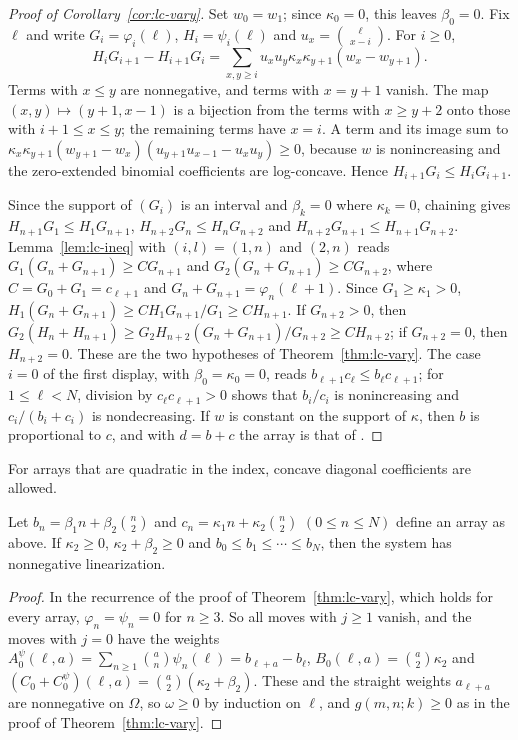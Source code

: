 \begin{proof}[Proof of Corollary~\ref{cor:lc-vary}]
Set $w_0=w_1$; since $\kappa_0=0$, this leaves $\beta_0=0$. Fix $\ell$ and write $G_i=\varphi_i(\ell)$, $H_i=\psi_i(\ell)$ and $u_x=\binom\ell{x-i}$. For $i\geq0$,
\[
H_iG_{i+1}-H_{i+1}G_i=\sum_{x,y\geq i}u_xu_y\kappa_x\kappa_{y+1}(w_x-w_{y+1}).
\]
Terms with $x\leq y$ are nonnegative, and terms with $x=y+1$ vanish. The map $(x,y)\mapsto(y+1,x-1)$ is a bijection from the terms with $x\geq y+2$ onto those with $i+1\leq x\leq y$; the remaining terms have $x=i$. A term and its image sum to $\kappa_x\kappa_{y+1}(w_{y+1}-w_x)(u_{y+1}u_{x-1}-u_xu_y)\geq0$, because $w$ is nonincreasing and the zero-extended binomial coefficients are log-concave. Hence $H_{i+1}G_i\leq H_iG_{i+1}$.

Since the support of $(G_i)$ is an interval and $\beta_k=0$ where $\kappa_k=0$, chaining gives $H_{n+1}G_1\leq H_1G_{n+1}$, $H_{n+2}G_n\leq H_nG_{n+2}$ and $H_{n+2}G_{n+1}\leq H_{n+1}G_{n+2}$. Lemma~\ref{lem:lc-ineq} with $(i,l)=(1,n)$ and $(2,n)$ reads $G_1(G_n+G_{n+1})\geq CG_{n+1}$ and $G_2(G_n+G_{n+1})\geq CG_{n+2}$, where $C=G_0+G_1=c_{\ell+1}$ and $G_n+G_{n+1}=\varphi_n(\ell+1)$. Since $G_1\geq\kappa_1>0$, $H_1(G_n+G_{n+1})\geq C H_1G_{n+1}/G_1\geq CH_{n+1}$. If $G_{n+2}>0$, then $G_2(H_n+H_{n+1})\geq G_2H_{n+2}(G_n+G_{n+1})/G_{n+2}\geq CH_{n+2}$; if $G_{n+2}=0$, then $H_{n+2}=0$. These are the two hypotheses of Theorem~\ref{thm:lc-vary}. The case $i=0$ of the first display, with $\beta_0=\kappa_0=0$, reads $b_{\ell+1}c_\ell\leq b_\ell c_{\ell+1}$; for $1\leq\ell<N$, division by $c_\ell c_{\ell+1}>0$ shows that $b_i/c_i$ is nonincreasing and $c_i/(b_i+c_i)$ is nondecreasing. If $w$ is constant on the support of $\kappa$, then $b$ is proportional to $c$, and with $d=b+c$ the array is that of \cite[Theorem~]{P1}.
\end{proof}

For arrays that are quadratic in the index, concave diagonal coefficients are allowed.

\begin{proposition}\label{prop:lc-quad}
Let $b_n=\beta_1n+\beta_2\binom n2$ and $c_n=\kappa_1n+\kappa_2\binom n2$ $(0\leq n\leq N)$ define an array as above. If $\kappa_2\geq0$, $\kappa_2+\beta_2\geq0$ and $b_0\leq b_1\leq\cdots\leq b_N$, then the system has nonnegative linearization.
\end{proposition}

\begin{proof}
In the recurrence of the proof of Theorem~\ref{thm:lc-vary}, which holds for every array, $\varphi_n=\psi_n=0$ for $n\geq3$. So all moves with $j\geq1$ vanish, and the moves with $j=0$ have the weights $A^\psi_0(\ell,a)=\sum_{n\geq1}\binom an\psi_n(\ell)=b_{\ell+a}-b_\ell$, $B_0(\ell,a)=\binom a2\kappa_2$ and $(C_0+C^\psi_0)(\ell,a)=\binom a2(\kappa_2+\beta_2)$. These and the straight weights $a_{\ell+a}$ are nonnegative on $\Omega$, so $\omega\geq0$ by induction on $\ell$, and $g(m,n;k)\geq0$ as in the proof of Theorem~\ref{thm:lc-vary}.
\end{proof}

